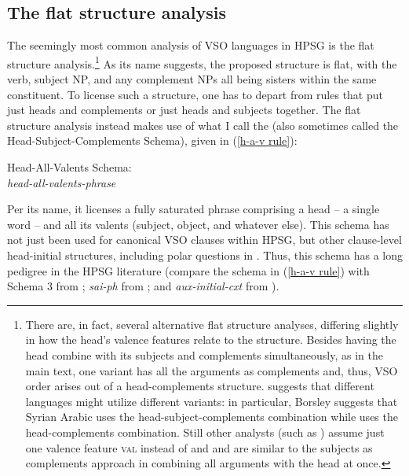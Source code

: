 \documentclass[output=paper
 	        ,biblatex
                ,babelshorthands
                ,newtxmath
                ,draftmode
                ,colorlinks, citecolor=brown
]{langscibook}
\begin{document}
\subsection{The flat structure analysis}
\label{understudied-sec-flat}

The seemingly most common analysis of VSO languages  in HPSG is the flat structure
analysis.\footnote{There are, in fact, several alternative flat structure analyses, differing
  slightly in how the head's valence features relate to the structure. Besides having the head
  combine with its subjects and complements simultaneously, as in the main text, one variant has all
  the arguments as complements and, thus, VSO order arises out of a head-complements
  structure. \citet{borsley95} suggests that different languages might utilize different variants:
  in particular, Borsley suggests that Syrian Arabic uses the
  head-subject-complements combination while  uses the head-complements
  combination. Still other analysts (such as \citealt{ball08thesis,ball17}) assume just one valence
  feature \textsc{val} instead of \subj and \comps and are similar to the subjects as complements
  approach in combining all arguments with the head at once.} As its name suggests, the proposed structure is flat, with the verb, subject NP, and any complement NPs all being sisters within the same constituent. To license such a structure, one has to depart from rules that put just heads and complements or just heads and subjects together. The flat structure analysis instead makes use of what I call the  (also sometimes called the Head-Subject-Complements Schema), given in (\ref{h-a-v rule}):   
%
\begin{samepage}
\begin{exe}
\ex \label{h-a-v rule}
Head-All-Valents Schema:\\
\emph{head-all-valents-phrase} \impl  \\
\end{exe}
\end{samepage}
%
Per its name, it licenses a fully saturated phrase comprising a head -- a single word -- and all its valents (subject, object, and whatever else). This schema has not just been used for canonical VSO clauses within HPSG, but other clause-level head-initial structures, including polar questions in . Thus, this schema has a long pedigree in the HPSG literature (compare the schema in (\ref{h-a-v rule}) with Schema 3 from \citealt[40]{ps2}; \textit{sai-ph} from \citealt[36]{GSag2000a-u}; and \textit{aux-initial-cxt} from \citealt[188]{Sag2012a}).
 
\end{document}
